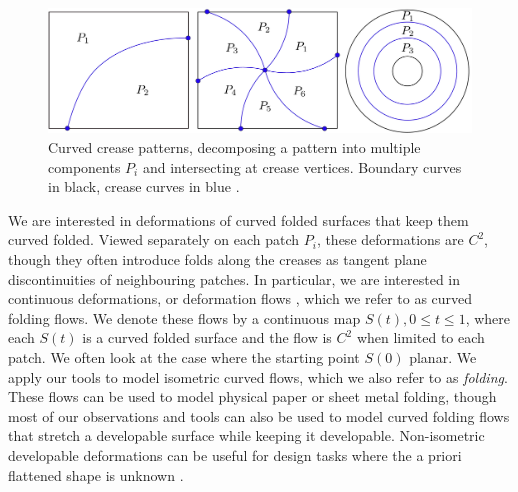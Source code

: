 \begin{figure} [h]
	\centering
	\includegraphics[width=\linewidth]{figures/crease_patterns}
	\caption{Curved crease patterns, decomposing a pattern into multiple components $P_i$ and intersecting at crease vertices. Boundary curves in black, crease curves in blue .}
	\label{fig:crease_pattern}
\end{figure}

We are interested in deformations of curved folded surfaces that keep them curved folded. Viewed separately on each patch $P_i$, these deformations are $C^2$, though they often introduce folds along the creases as tangent plane discontinuities of neighbouring patches. In particular, we are interested in continuous deformations, or deformation flows \cite{rabi2018shape}, which we refer to as curved folding flows. We denote these flows by a continuous map $S(t), 0 \leq t \leq 1$, where each $S(t)$ is a curved folded surface and the flow is $C^2$ when limited to each patch. We often look at the case where the starting point $S(0)$ planar. We apply our tools to model isometric curved flows, which we also refer to as \emph{folding}. These flows can be used to model physical paper or sheet metal folding, though most of our observations and tools can also be used to model curved folding flows that stretch a developable surface while keeping it developable. Non-isometric developable deformations can be useful for design tasks where the a priori flattened shape is unknown \cite{rabi18,rabi2018shape,pottmann_new}.

